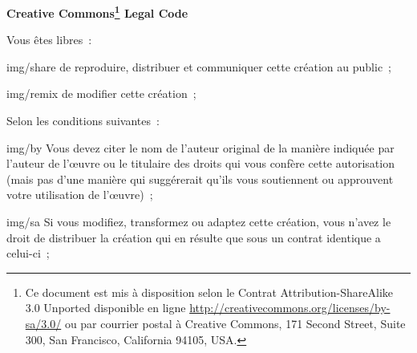 {}
\begin{center}
  \textbf{\LARGE{Creative Commons\footnote{ Ce document est mis à
        disposition selon le Contrat Attribution-ShareAlike 3.0
        Unported disponible en ligne
        \url{http://creativecommons.org/licenses/by-sa/3.0/} ou par
        courrier postal à Creative Commons, 171 Second Street, Suite
        300, San Francisco, California 94105, USA.} Legal Code} }
\end{center}
\vspace{1cm}

\begin{lblock}{Vous êtes libres~:}

  \begin{pictonote}{img/share}
    de reproduire, distribuer et communiquer cette création au
    public~;
  \end{pictonote}

  \begin{pictonote}{img/remix}
    de modifier cette création~;
  \end{pictonote}

\end{lblock}
\begin{lblock}{Selon les conditions suivantes~:}

  \begin{pictonote}{img/by}
     Vous devez citer le nom de l'auteur
    original de la manière indiquée par l'auteur de l'œuvre ou le
    titulaire des droits qui vous confère cette autorisation (mais pas
    d'une manière qui suggérerait qu'ils vous soutiennent ou
    approuvent votre utilisation de l'œuvre)~;
  \end{pictonote}

  \begin{pictonote}{img/sa}
     Si
    vous modifiez, transformez ou adaptez cette création, vous n'avez
    le droit de distribuer la création qui en résulte que sous un
    contrat identique a celui-ci~;
  \end{pictonote}

\end{lblock}
